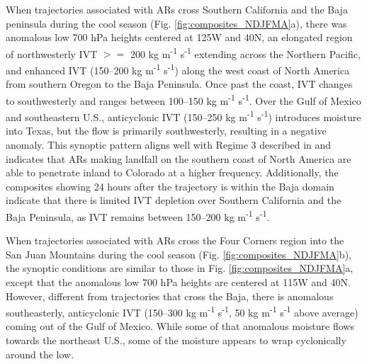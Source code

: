 \documentclass[draft]{agujournal2019}
\begin{document}
When trajectories associated with ARs cross Southern California and the Baja peninsula during the cool season (Fig. \ref{fig:composites_NDJFMA}a), there was anomalous low 700 hPa heights centered at 125\textdegree W and 40\textdegree N, an elongated region of northwesterly IVT $>=$ 200 kg m\textsuperscript{-1} s\textsuperscript{-1} extending across the Northern Pacific, and enhanced IVT (150--200 kg m\textsuperscript{-1} s\textsuperscript{-1}) along the west coast of North America from southern Oregon to the Baja Peninsula. Once past the coast, IVT changes to southwesterly and ranges between 100--150 kg m\textsuperscript{-1} s\textsuperscript{-1}. Over the Gulf of Mexico and southeastern U.S., anticyclonic IVT (150--250 kg m\textsuperscript{-1} s\textsuperscript{-1}) introduces moisture into Texas, but the flow is primarily southwesterly, resulting in a negative anomaly. This synoptic pattern aligns well with Regime 3 described in  and indicates that ARs making landfall on the southern coast of North America are able to penetrate inland to Colorado at a higher frequency. Additionally, the composites showing 24 hours after the trajectory is within the Baja domain indicate that there is limited IVT depletion over Southern California and the Baja Peninsula, as IVT remains between 150--200 kg m\textsuperscript{-1} s\textsuperscript{-1}. 



When trajectories associated with ARs cross the Four Corners region into the San Juan Mountains during the cool season (Fig. \ref{fig:composites_NDJFMA}b), the synoptic conditions are similar to those in Fig. \ref{fig:composites_NDJFMA}a, except that the anomalous low 700 hPa heights are centered at 115\textdegree W and 40\textdegree N. However, different from trajectories that cross the Baja, there is anomalous southeasterly, anticyclonic IVT (150--300 kg m\textsuperscript{-1} s\textsuperscript{-1}, 50 kg m\textsuperscript{-1} s\textsuperscript{-1} above average) coming out of the Gulf of Mexico. While some of that anomalous moisture flows towards the northeast U.S., some of the moisture appears to wrap cyclonically around the low. 
\end{document}
